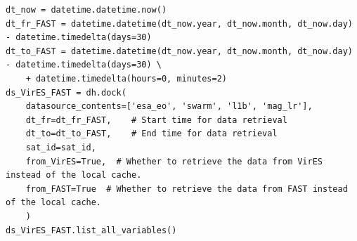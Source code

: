 \begin{verbatim}
dt_now = datetime.datetime.now()
dt_fr_FAST = datetime.datetime(dt_now.year, dt_now.month, dt_now.day) - datetime.timedelta(days=30)
dt_to_FAST = datetime.datetime(dt_now.year, dt_now.month, dt_now.day) - datetime.timedelta(days=30) \
    + datetime.timedelta(hours=0, minutes=2)
ds_VirES_FAST = dh.dock(
    datasource_contents=['esa_eo', 'swarm', 'l1b', 'mag_lr'], 
    dt_fr=dt_fr_FAST,    # Start time for data retrieval
    dt_to=dt_to_FAST,    # End time for data retrieval
    sat_id=sat_id,
    from_VirES=True,  # Whether to retrieve the data from VirES instead of the local cache. 
    from_FAST=True  # Whether to retrieve the data from FAST instead of the local cache.
    )
ds_VirES_FAST.list_all_variables()
\end{verbatim}

